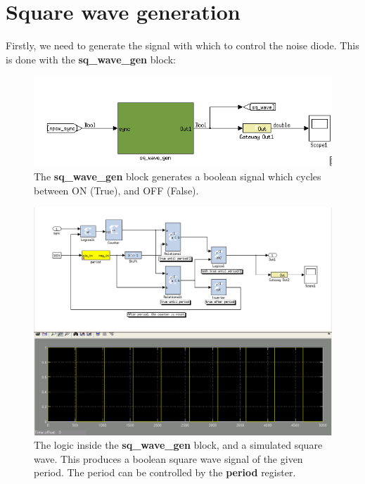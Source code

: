 \documentclass[letterpaper,10pt,english]{sphinxmanual}
\begin{document}
\section{Square wave generation}
\label{noise_diode:square-wave-generation}
Firstly, we need to generate the signal with which to control the noise diode. This is done
with the \textbf{sq\_wave\_gen} block:
\begin{figure}[htbp]
\centering
\capstart

\includegraphics{sq_wave_gen_2.png}
\caption{The \textbf{sq\_wave\_gen} block generates a boolean signal which cycles between ON (True),
and OFF (False).}\end{figure}
\begin{figure}[htbp]
\centering
\capstart

\includegraphics{sq_wave_gen.png}
\caption{The logic inside the \textbf{sq\_wave\_gen} block, and a simulated square wave.
This produces a boolean square wave signal of the given period.
The period can be controlled by the \textbf{period} register.}\end{figure}
\end{document}
